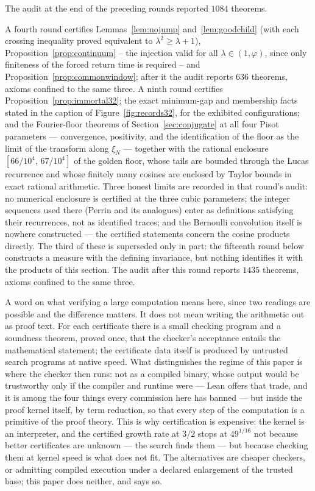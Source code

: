 \documentclass[11pt,reqno]{amsart}
\theoremstyle{plain}
\theoremstyle{definition}
\theoremstyle{remark}
\begin{document}
The audit at the end of the preceding rounds reported $1084$ theorems.

A fourth round certifies
Lemmas~\ref{lem:nojump} and~\ref{lem:goodchild} (with each crossing inequality
proved equivalent to $\lambda^2\geq\lambda+1$),
Proposition~\ref{prop:continuum} -- the injection valid for all
$\lambda\in(1,\varphi)$, since only finiteness of the forced return time is
required -- and Proposition~\ref{prop:commonwindow}; after it the audit
reports $636$ theorems, axioms confined to the same three. A ninth round certifies Proposition~\ref{prop:immortal32}; the exact
minimum-gap and membership facts stated in the caption of
Figure~\ref{fig:records32}, for the exhibited configurations; and the
Fourier-floor theorems of Section~\ref{sec:conjugate} at all four Pisot
parameters --- convergence, positivity, and the identification of the floor as
the limit of the transform along $\xi_N$ --- together with the rational
enclosure $[66/10^4,\,67/10^4]$ of the golden floor, whose tails are bounded
through the Lucas recurrence and whose finitely many cosines are enclosed by
Taylor bounds in exact rational arithmetic. Three honest limits are recorded
in that round's audit: no numerical enclosure is certified at the three cubic
parameters; the integer sequences used there (Perrin and its analogues) enter
as definitions satisfying their recurrences, not as identified traces; and the
Bernoulli convolution itself is nowhere constructed --- the certified
statements concern the cosine products directly. The third of these is
superseded only in part: the fifteenth round below constructs a measure with
the defining invariance, but nothing identifies it with the products of this
section. The audit after this round
reports $1435$ theorems, axioms confined to the same three.

A word on what verifying a large computation means here, since two readings
are possible and the difference matters. It does not mean writing the
arithmetic out as proof text. For each certificate there is a small checking
program and a soundness theorem, proved once, that the checker's acceptance
entails the mathematical statement; the certificate data itself is produced
by untrusted search programs at native speed. What distinguishes the regime
of this paper is where the checker then runs: not as a compiled binary, whose
output would be trustworthy only if the compiler and runtime were --- Lean
offers that trade, and it is among the four things every commission here has
banned --- but inside the proof kernel itself, by term reduction, so that
every step of the computation is a primitive of the proof theory. This is
why certification is expensive: the kernel is an interpreter, and the
certified growth rate at $3/2$ stops at $49^{1/16}$ not because better
certificates are unknown --- the search finds them --- but because checking
them at kernel speed is what does not fit. The alternatives are cheaper
checkers, or admitting compiled execution under a declared enlargement of
the trusted base; this paper does neither, and says so.
\end{document}
